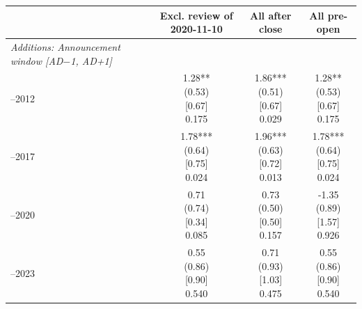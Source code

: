\begin{threeparttable}
\begingroup
\renewcommand\cellalign{t}
\renewcommand\arraystretch{1}
\setlength{\tabcolsep}{5pt}
\begin{tabular}{@{}lccc}
\toprule
 & Excl. review of 2020-11-10 & All after close & All pre-open \\
\midrule
\emph{Additions: Announcement window [AD$-$1, AD+1]} \\
\addlinespace[0.25ex]
\addlinespace[1ex]
2007–2012 & \makecell{1.28**\\(0.53)\\{}[0.67]\\{0.175}} & \makecell{1.86***\\(0.51)\\{}[0.67]\\{0.029}} & \makecell{1.28**\\(0.53)\\{}[0.67]\\{0.175}} \\
\addlinespace[0.25ex]
\addlinespace[0.25ex]
2013–2017 & \makecell{1.78***\\(0.64)\\{}[0.75]\\{0.024}} & \makecell{1.96***\\(0.63)\\{}[0.72]\\{0.013}} & \makecell{1.78***\\(0.64)\\{}[0.75]\\{0.024}} \\
\addlinespace[0.25ex]
\addlinespace[0.25ex]
2018–2020 & \makecell{0.71\\(0.74)\\{}[0.34]\\{0.085}} & \makecell{0.73\\(0.50)\\{}[0.50]\\{0.157}} & \makecell{-1.35\\(0.89)\\{}[1.57]\\{0.926}} \\
\addlinespace[0.25ex]
\addlinespace[0.25ex]
2021–2023 & \makecell{0.55\\(0.86)\\{}[0.90]\\{0.540}} & \makecell{0.71\\(0.93)\\{}[1.03]\\{0.475}} & \makecell{0.55\\(0.86)\\{}[0.90]\\{0.540}} \\

\end{tabular}
\end{threeparttable}
